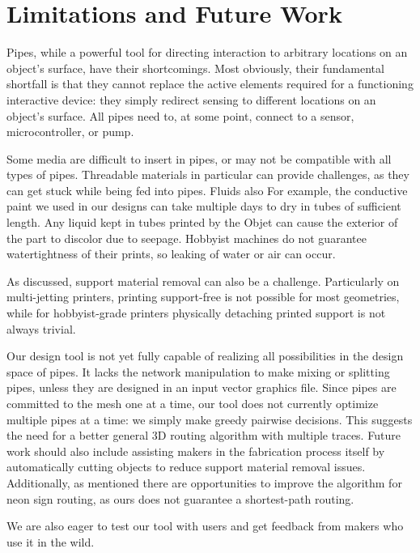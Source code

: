 \section{Limitations and Future Work}
Pipes, while a powerful tool for directing interaction to arbitrary locations on an object's surface, have their shortcomings.  Most obviously, their fundamental shortfall is that they cannot replace the active elements required for a functioning interactive device: they simply redirect sensing to different locations on an object's surface.  All pipes need to, at some point, connect to a sensor, microcontroller, or pump.

Some media are difficult to insert in pipes, or may not be compatible with all types of pipes.  Threadable materials in particular can provide challenges, as they can get stuck while being fed into pipes.  Fluids also  For example, the conductive paint we used in our designs can take multiple days to dry in tubes of sufficient length.  Any liquid kept in tubes printed by the Objet can cause the exterior of the part to discolor due to seepage.  Hobbyist machines do not guarantee watertightness of their prints, so leaking of water or air can occur.

As discussed, support material removal can also be a challenge.  Particularly on multi-jetting printers, printing support-free is not possible for most geometries, while for hobbyist-grade printers physically detaching printed support is not always trivial.

Our design tool is not yet fully capable of realizing all possibilities in the design space of pipes.  It lacks the network manipulation to make mixing or splitting pipes, unless they are designed in an input vector graphics file.  Since pipes are committed to the mesh one at a time, our tool does not currently optimize multiple pipes at a time: we simply make greedy pairwise decisions.  This suggests the need for a better general 3D routing algorithm with multiple traces.  Future work should also include assisting makers in the fabrication process itself by automatically cutting objects to reduce support material removal issues.  Additionally, as mentioned there are opportunities to improve the algorithm for neon sign routing, as ours does not guarantee a shortest-path routing.

We are also eager to test our tool with users and get feedback from makers who use it in the wild.